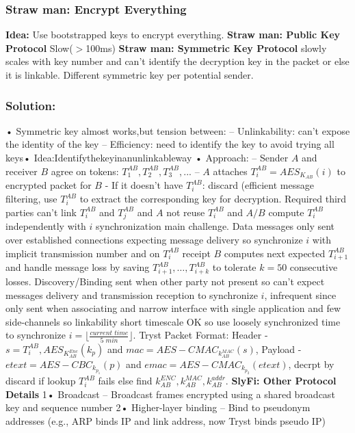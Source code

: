\documentclass[9pt]{extarticle}
\begin{document}
\begin{multicols}{2}
\subsubsection{Straw man: Encrypt Everything}
\textbf{Idea:} Use bootstrapped keys to encrypt everything. \textbf{Straw man: Public Key Protocol} Slow($>$100ms) \textbf{Straw man: Symmetric Key Protocol} slowly scales with key number and can’t identify the decryption key in the packet or else it is linkable. Different symmetric key per potential sender. 


\subsubsection{Solution: 
}
• Symmetric key almost works,but tension between: – Unlinkability: can’t expose the identity of the key – Efficiency: need to identify the key to avoid trying all keys• Idea:Identifythekeyinanunlinkableway • Approach:
–  Sender $A$ and receiver $B$ agree on tokens: $T_1^{AB}, T_2^{AB}, T_3^{AB}, ...$ – $A$ attaches $T_i^{AB}=AES_{K_{AB}}(i)$ to encrypted packet for $B$ - If it doesn’t have $T_i^{AB}$: discard (efficient message filtering, use $T_i^{AB}$ to extract the corresponding key for decryption. Required third parties can't link $T_i^{AB}$ and $T_j^{AB}$ and $A$ not reuse $T_i^{AB}$ and $A/B$ compute $T_i^{AB}$ independently with $i$ synchronization main challenge. Data messages only sent over established connections expecting message delivery so synchronize $i$ with implicit transmission number and on $T_i^{AB}$ receipt $B$ computes next expected $T_{i+1}^{AB}$ and handle message loss by saving $T_{i+1}^{AB},\dots,T_{i+k}^{AB}$ to tolerate $k=50$ consecutive losses.  Discovery/Binding sent when other party not present so can’t expect messages delivery and transmission reception to synchronize $i$, infrequent since only sent when associating and narrow interface with single application and few side-channels so linkability short timescale OK so use loosely synchronized time to synchronize $i=\lfloor\frac{\textit{current time}}{5\textit{ min}}\rfloor$. Tryst Packet Format: Header - $s={T_i^{AB}, AES_{K_{AB}^{Enc}}(k_p)}$ and $mac=AES-CMAC_{k_{AB}^{MAC}}(s)$, Payload - $etext=AES-CBC_{k_{p_1}}(p)$ and $emac=AES-CMAC_{k_{p_2}}(etext)$, decrpt by discard if lookup $T_i^{AB}$ fails else find $k_{AB}^{ENC},k_{AB}^{MAC},k_{AB}^{addr}$. \textbf{SlyFi: Other Protocol Details} 1• Broadcast
– Broadcast frames encrypted using a shared
broadcast key and sequence number 2• Higher-layer binding – Bind to pseudonym addresses (e.g., ARP binds IP and link address, now Tryst binds pseudo IP)

\end{multicols}
\end{document}
